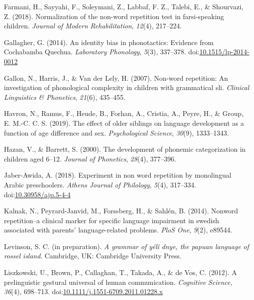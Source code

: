 \documentclass[english,,man,floatsintext]{apa6}
\begin{document}
\hypertarget{ref-farmani2018normalization}{}
Farmani, H., Sayyahi, F., Soleymani, Z., Labbaf, F. Z., Talebi, E., \&
Shourvazi, Z. (2018). Normalization of the non-word repetition test in
farsi-speaking children. \emph{Journal of Modern Rehabilitation},
\emph{12}(4), 217--224.

\hypertarget{ref-gallagher2014identity}{}
Gallagher, G. (2014). An identity bias in phonotactics: Evidence from
Cochabamba Quechua. \emph{Laboratory Phonology}, \emph{5}(3), 337--378.
doi:\href{https://doi.org/10.1515/lp-2014-0012}{10.1515/lp-2014-0012}

\hypertarget{ref-gallon2007non}{}
Gallon, N., Harris, J., \& Van der Lely, H. (2007). Non-word repetition:
An investigation of phonological complexity in children with grammatical
sli. \emph{Clinical Linguistics \& Phonetics}, \emph{21}(6), 435--455.

\hypertarget{ref-havron2019effect}{}
Havron, N., Ramus, F., Heude, B., Forhan, A., Cristia, A., Peyre, H., \&
Group, E. M.-C. C. S. (2019). The effect of older siblings on language
development as a function of age difference and sex. \emph{Psychological
Science}, \emph{30}(9), 1333--1343.

\hypertarget{ref-hazan2000development}{}
Hazan, V., \& Barrett, S. (2000). The development of phonemic
categorization in children aged 6--12. \emph{Journal of Phonetics},
\emph{28}(4), 377--396.

\hypertarget{ref-jabere2018xperiment}{}
Jaber-Awida, A. (2018). Experiment in non word repetition by monolingual
Arabic preschoolers. \emph{Athens Journal of Philology}, \emph{5}(4),
317--334.
doi:\href{https://doi.org/10.30958/ajp.5-4-4}{10.30958/ajp.5-4-4}

\hypertarget{ref-kalnak2014nonword}{}
Kalnak, N., Peyrard-Janvid, M., Forssberg, H., \& Sahlén, B. (2014).
Nonword repetition--a clinical marker for specific language impairment
in swedish associated with parents' language-related problems.
\emph{PloS One}, \emph{9}(2), e89544.

\hypertarget{ref-levinsoninprepydgrammar}{}
Levinson, S. C. (in preparation). \emph{A grammar of yélî dnye, the
papuan language of rossel island}. Cambridge, UK: Cambridge University
Press.

\hypertarget{ref-liszkowski2012prelinguistic}{}
Liszkowski, U., Brown, P., Callaghan, T., Takada, A., \& de Vos, C.
(2012). A prelinguistic gestural universal of human communication.
\emph{Cognitive Science}, \emph{36}(4), 698--713.
doi:\href{https://doi.org/10.1111/j.1551-6709.2011.01228.x}{10.1111/j.1551-6709.2011.01228.x}
\end{document}
